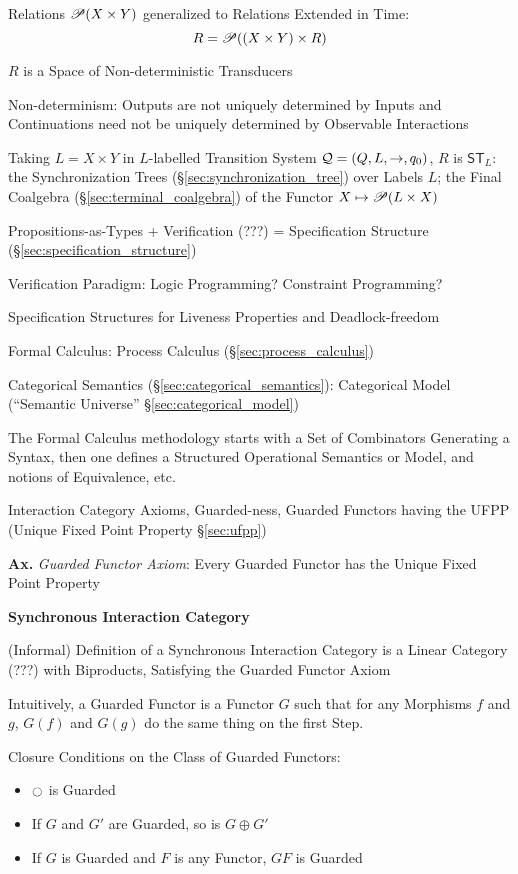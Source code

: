 Relations $\mathscr{P}(X \times Y)$ generalized to Relations Extended in
Time:
\[
  R = \mathscr{P}((X \times Y) \times R)
\]

$R$ is a Space of Non-deterministic Transducers

Non-determinism: Outputs are not uniquely determined by Inputs and
Continuations need not be uniquely determined by Observable Interactions

Taking $L = X \times Y$ in $L$-labelled Transition System $\mathcal{Q} =
(Q,L,\rightarrow,q_0)$, $R$ is $\mathsf{ST}_L$: the Synchronization
Trees (\S\ref{sec:synchronization_tree}) over Labels $L$; the Final
Coalgebra (\S\ref{sec:terminal_coalgebra}) of the Functor $X \mapsto
\mathscr{P}(L \times X)$


\asterism


Propositions-as-Types + Verification (???) = Specification Structure
(\S\ref{sec:specification_structure})

Verification Paradigm: Logic Programming? Constraint Programming?

Specification Structures for Liveness Properties and Deadlock-freedom

Formal Calculus: Process Calculus (\S\ref{sec:process_calculus})

Categorical Semantics (\S\ref{sec:categorical_semantics}): Categorical
Model (``Semantic Universe'' \S\ref{sec:categorical_model})

The Formal Calculus methodology starts with a Set of Combinators
Generating a Syntax, then one defines a Structured Operational
Semantics or Model, and notions of Equivalence, etc.

Interaction Category Axioms, Guarded-ness, Guarded Functors having the
UFPP (Unique Fixed Point Property \S\ref{sec:ufpp}) %

\textbf{Ax.} \emph{Guarded Functor Axiom}: Every Guarded Functor has
the Unique Fixed Point Property


\textbf{Synchronous Interaction Category}

(Informal) Definition of a Synchronous Interaction Category is a
Linear Category (???) with Biproducts, Satisfying the Guarded Functor
Axiom

Intuitively, a Guarded Functor is a Functor $G$ such that for any
Morphisms $f$ and $g$, $G(f)$ and $G(g)$ do the same thing on the
first Step.

Closure Conditions on the Class of Guarded Functors:
\begin{itemize}
  \item $\ocircle$ is Guarded
  \item If $G$ and $G'$ are Guarded, so is $G \oplus G'$
  \item If $G$ is Guarded and $F$ is any Functor, $G F$ is Guarded
\end{itemize}

